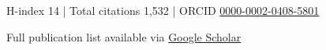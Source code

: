 


\begin{center}
H-index 14 | Total citations 1,532 | ORCID \href{https://orcid.org/0000-0002-0408-5801}{0000-0002-0408-5801}
\end{center}

\vspace{0.5em}

\begin{center}
Full publication list available via \href{https://scholar.google.co.uk/citations?hl=en&user=3bPMK_oAAAAJ}{Google Scholar}
\end{center}


